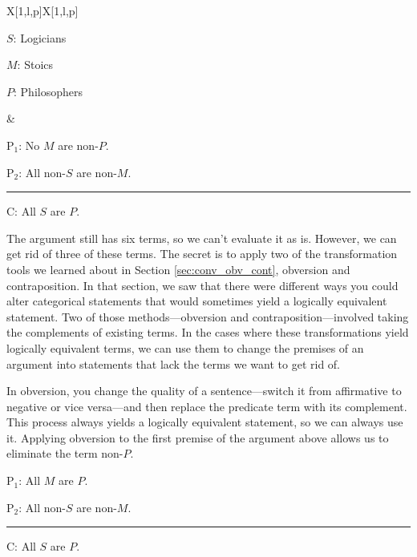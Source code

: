 {\begin{tabu}{{X[1,l,p]X[1,l,p]}}

\begin{ekey}
\item[$S$:] Logicians
\item[$M$:] Stoics
\item[$P$:] Philosophers
\end{ekey}

&

\begin{earg}
\item[P$_1$:]  No $M$ are non-$P$.
\item[P$_2$:] All non-$S$ are non-$M$.
\vspace{-.5em}
\item [] \rule{0.6\linewidth}{.5pt} 
\item[C:] All $S$ are $P$.
\end{earg} 

\end{tabu}

The argument still has six terms, so we can't evaluate it as is. However, we can get rid of three of these terms. The secret is to apply two of the transformation tools we learned about in Section \ref{sec:conv_obv_cont}, obversion and contraposition. In that section, we saw that there were different ways you could alter categorical statements that would sometimes yield a logically equivalent statement. Two of those methods---obversion and contraposition---involved taking the complements of existing terms. In the cases where these transformations yield logically equivalent terms, we can use them to change the premises of an argument into statements that lack the terms we want to get rid of. 

In obversion, you change the quality of a sentence---switch it from affirmative to negative or vice versa---and then replace the predicate term with its complement. This process always yields a logically equivalent statement, so we can always use it. Applying obversion to the first premise of the argument above allows us to eliminate the term non-$P$.  

\begin{earg}
\item[P$_1$:]  All $M$ are $P$.
\item[P$_2$:] All non-$S$ are non-$M$.
\vspace{-.5em}
\item [] \rule{0.25\linewidth}{.5pt} 
\item[C:] All $S$ are $P$.
\end{earg} 

}
